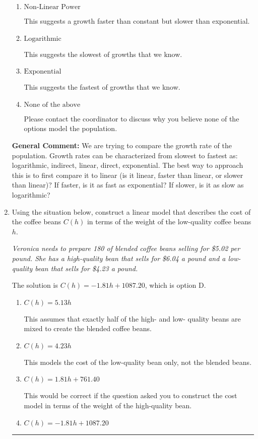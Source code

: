 \documentclass{extbook}[14pt]
\newcommand{\litem}[1]{\item #1

\rule{\textwidth}{0.4pt}}
\begin{document}
\begin{enumerate}
{\begin{enumerate}[label=\Alph*.]
This suggests a constant growth. You would be able to add or subtract the same amount year-to-year if this is the correct answer.
\item \( \text{Non-Linear Power} \)

This suggests a growth faster than constant but slower than exponential.
\item \( \text{Logarithmic} \)

This suggests the slowest of growths that we know.
\item \( \text{Exponential} \)

This suggests the fastest of growths that we know.
\item \( \text{None of the above} \)

Please contact the coordinator to discuss why you believe none of the options model the population.
\end{enumerate}

\textbf{General Comment:} We are trying to compare the growth rate of the population. Growth rates can be characterized from slowest to fastest as: logarithmic, indirect, linear, direct, exponential. The best way to approach this is to first compare it to linear (is it linear, faster than linear, or slower than linear)? If faster, is it as fast as exponential? If slower, is it as slow as logarithmic?
}
\litem{
Using the situation below, construct a linear model that describes the cost of the coffee beans $C(h)$ in terms of the weight of the low-quality coffee beans $h$.

\begin{center}
    \textit{ Veronica needs to prepare 180 of blended coffee beans selling for \$5.02 per pound. She has a high-quality bean that sells for \$6.04 a pound and a low-quality bean that sells for \$4.23 a pound. }
\end{center}
The solution is \( C(h) = -1.81 h + 1087.20 \), which is option D.\begin{enumerate}[label=\Alph*.]
\item \( C(h) = 5.13 h \)

This assumes that exactly half of the high- and low- quality beans are mixed to create the blended coffee beans.
\item \( C(h) = 4.23 h \)

This models the cost of the low-quality bean only, not the blended beans.
\item \( C(h) = 1.81 h + 761.40 \)

This would be correct if the question asked you to construct the cost model in terms of the weight of the high-quality bean.
\item \( C(h) = -1.81 h + 1087.20 \)


\end{enumerate}}
\end{enumerate}
\end{document}

